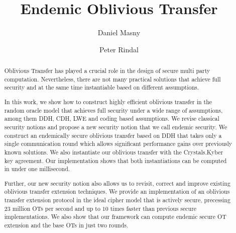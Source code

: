 \documentclass[10pt]{article}
\title{Endemic Oblivious Transfer}
\author{Daniel Masny \and Peter Rindal}
\institute{VISA Research}
\begin{document}
\maketitle

\begin{abstract}
Oblivious Transfer has played a crucial role in the design of secure multi party computation. Nevertheless, there are not many practical solutions that achieve full security and at the same time instantiable based on different assumptions.

In this work, we show how to construct highly efficient oblivious transfer in the random oracle model that achieves full security under a wide range of assumptions, among them DDH, CDH, LWE and coding based assumptions. We revise classical security notions and propose a new security notion that we call endemic security. We construct an endemically secure oblivious transfer based on DDH that takes only a single communication round which allows significant performance gains over previously known solutions. We also instantiate our oblivious transfer with the Crystals.Kyber key agreement. Our implementation shows that both instantiations can be computed in under one millisecond. 

Further, our new security notion also allows us to revisit, correct and improve existing oblivious transfer extension techniques. We provide an implementation of an oblivious transfer extension protocol in the ideal cipher model that is actively secure, precessing 23 million OTs per second and up to $10$ times faster than previous secure implementations. We also show that our framework can compute endemic secure OT extension and the base OTs in just two rounds.

\end{abstract}









% 






\appendix




%



%
\end{document}
